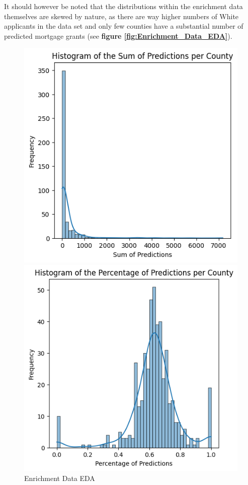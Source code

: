 It should however be noted that the distributions within the enrichment data themselves are skewed by nature, as there are way higher numbers of White applicants in the data set and only few counties have a substantial number of predicted mortgage grants (see \textbf{figure \ref{fig:Enrichment_Data_EDA}}).

\begin{figure}[h]
    \centering
    \caption{Enrichment Data EDA}
    \begin{minipage}{0.33\textwidth}
        \centering
        \includegraphics[width=\textwidth]{images/geo_enrich/predictions_per_county.png}
    \end{minipage}\hfill
    \begin{minipage}{0.33\textwidth}
        \centering
        \includegraphics[width=\textwidth]{images/geo_enrich/perc_predictions.png}

\end{minipage}
\end{figure}
